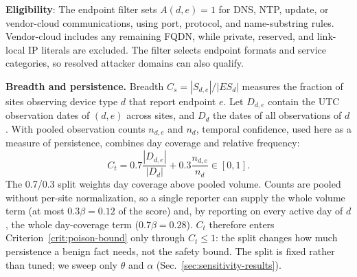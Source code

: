 \documentclass[journal]{IEEEtran}
\theoremstyle{definition}
\begin{document}
\textbf{Eligibility}: The endpoint filter sets $A(d,e)=1$ for DNS, NTP, update, or vendor-cloud communications, using port, protocol, and name-substring rules. Vendor-cloud includes any remaining FQDN, while private, reserved, and link-local IP literals are excluded. The filter selects endpoint formats and service categories, so resolved attacker domains can also qualify.

\textbf{Breadth and persistence.} Breadth $C_s=|S_{d,e}|/|ES_d|$ measures the fraction of sites observing device type $d$ that report endpoint $e$. Let $D_{d,e}$ contain the UTC observation dates of $(d,e)$ across sites, and $D_d$ the dates of all observations of $d$. With pooled observation counts $n_{d,e}$ and $n_d$, temporal confidence, used here as a measure of persistence, combines day coverage and relative frequency:
\begin{equation}
C_t=0.7\frac{|D_{d,e}|}{|D_d|}+0.3\frac{n_{d,e}}{n_d}\in[0,1].
\label{eq:ct}
\end{equation}
The 0.7/0.3 split weights day coverage above pooled volume. Counts are pooled without per-site normalization, so a single reporter can supply the whole volume term (at most $0.3\beta=0.12$ of the score) and, by reporting on every active day of $d$, the whole day-coverage term ($0.7\beta=0.28$). $C_t$ therefore enters Criterion~\ref{crit:poison-bound} only through $C_t\le1$: the split changes how much persistence a benign fact needs, not the safety bound. The split is fixed rather than tuned; we sweep only $\theta$ and $\alpha$ (Sec.~\ref{sec:sensitivity-results}).
\end{document}
